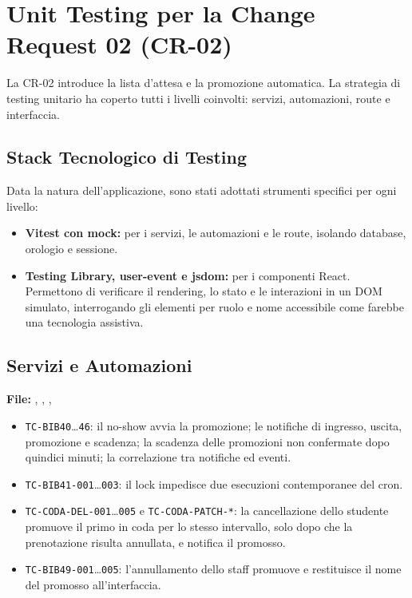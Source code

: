\documentclass[11pt,a4paper,oneside,openany]{book}
\begin{document}
\section{Unit Testing per la Change Request 02 (CR-02)}

La CR-02 introduce la lista d'attesa e la promozione automatica. La strategia
di testing unitario ha coperto tutti i livelli coinvolti: servizi,
automazioni, route e interfaccia.

\subsection{Stack Tecnologico di Testing}

Data la natura dell'applicazione, sono stati adottati strumenti specifici per
ogni livello:
\begin{itemize}
  \item \textbf{Vitest con mock:} per i servizi, le automazioni e le route,
        isolando database, orologio e sessione.
  \item \textbf{Testing Library, user-event e jsdom:} per i componenti React.
        Permettono di verificare il rendering, lo stato e le interazioni in un
        DOM simulato, interrogando gli elementi per ruolo e nome accessibile
        come farebbe una tecnologia assistiva.
\end{itemize}

\subsection{Servizi e Automazioni}

\textbf{File:} ,
,
,

\begin{itemize}
  \item \texttt{TC-BIB40}\dots\texttt{46}: il no-show avvia la promozione;
        le notifiche di ingresso, uscita, promozione e scadenza; la scadenza
        delle promozioni non confermate dopo quindici minuti; la correlazione
        tra notifiche ed eventi.
  \item \texttt{TC-BIB41-001}\dots\texttt{003}: il lock impedisce due
        esecuzioni contemporanee del cron.
  \item \texttt{TC-CODA-DEL-001}\dots\texttt{005} e
        \texttt{TC-CODA-PATCH-*}: la cancellazione dello studente promuove il
        primo in coda per lo stesso intervallo, solo dopo che la prenotazione
        risulta annullata, e notifica il promosso.
  \item \texttt{TC-BIB49-001}\dots\texttt{005}: l'annullamento dello staff
        promuove e restituisce il nome del promosso all'interfaccia.
\end{itemize}
\end{document}
